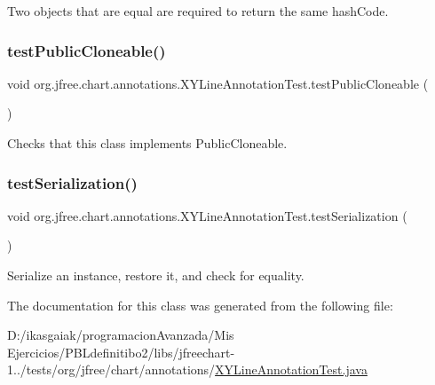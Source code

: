 Two objects that are equal are required to return the same hash\+Code. \mbox{\label{classorg_1_1jfree_1_1chart_1_1annotations_1_1_x_y_line_annotation_test_a63af6ec93c9b02b1ef3e08b3b0d09aa3}} 
\subsubsection{\texorpdfstring{test\+Public\+Cloneable()}{testPublicCloneable()}}
{\footnotesize\ttfamily void org.\+jfree.\+chart.\+annotations.\+X\+Y\+Line\+Annotation\+Test.\+test\+Public\+Cloneable (\begin{DoxyParamCaption}{ }\end{DoxyParamCaption})}

Checks that this class implements Public\+Cloneable. \mbox{\label{classorg_1_1jfree_1_1chart_1_1annotations_1_1_x_y_line_annotation_test_af52cf9b96badbddad45277761974d415}} 
\subsubsection{\texorpdfstring{test\+Serialization()}{testSerialization()}}
{\footnotesize\ttfamily void org.\+jfree.\+chart.\+annotations.\+X\+Y\+Line\+Annotation\+Test.\+test\+Serialization (\begin{DoxyParamCaption}{ }\end{DoxyParamCaption})}

Serialize an instance, restore it, and check for equality. 

The documentation for this class was generated from the following file\+:\begin{DoxyCompactItemize}
\item 
D\+:/ikasgaiak/programacion\+Avanzada/\+Mis Ejercicios/\+P\+B\+Ldefinitibo2/libs/jfreechart-\/1../tests/org/jfree/chart/annotations/\mbox{\hyperlink{_x_y_line_annotation_test_8java}{X\+Y\+Line\+Annotation\+Test.\+java}}\end{DoxyCompactItemize}
